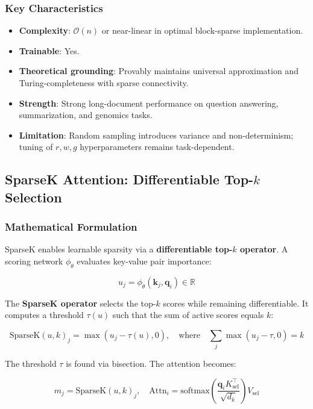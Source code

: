 \documentclass[11pt,a4paper]{article}
\begin{document}
\subsubsection{Key Characteristics}

\begin{itemize}[leftmargin=*]
    \item \textbf{Complexity}: $\mathcal{O}(n)$ or near-linear in optimal block-sparse implementation.
    \item \textbf{Trainable}: Yes.
    \item \textbf{Theoretical grounding}: Provably maintains universal approximation and Turing-completeness with sparse connectivity.
    \item \textbf{Strength}: Strong long-document performance on question answering, summarization, and genomics tasks.
    \item \textbf{Limitation}: Random sampling introduces variance and non-determinism; tuning of $r, w, g$ hyperparameters remains task-dependent.
\end{itemize}

\subsection{SparseK Attention: Differentiable Top-$k$ Selection}

\subsubsection{Mathematical Formulation}

SparseK \citep{lou_sparsek_2024} enables learnable sparsity via a \textbf{differentiable top-$k$ operator}. A scoring network $\phi_\theta$ evaluates key-value pair importance:

\[
u_j = \phi_\theta(\mathbf{k}_j, \mathbf{q}_i) \in \mathbb{R}
\]

The \textbf{SparseK operator} selects the top-$k$ scores while remaining differentiable. It computes a threshold $\tau(u)$ such that the sum of active scores equals $k$:

\[
\text{SparseK}(u, k)_j = \max(u_j - \tau(u), 0), \quad \text{where} \quad \sum_j \max(u_j - \tau, 0) = k
\]

The threshold $\tau$ is found via bisection. The attention becomes:

\[
m_j = \text{SparseK}(u, k)_j, \quad \text{Attn}_i = \text{softmax}\left(\frac{\mathbf{q}_i K_{\text{sel}}^\top}{\sqrt{d_k}}\right) V_{\text{sel}}
\]
\end{document}
